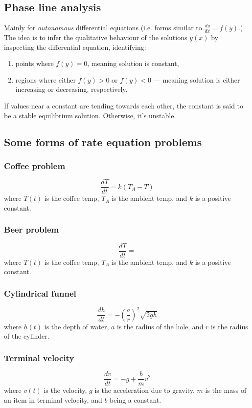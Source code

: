 \documentclass[main.tex]{subfiles}
\begin{document}
	\subsection*{Phase line analysis}
	Mainly for \emph{autonomous} differential equations (i.e. forms similar to \(\frac{dy}{dx} = f(y)\).)
	The idea is to infer the qualitative behaviour of the solutions \(y(x)\) by inspecting the differential equation, identifying:
	\begin{enumerate}
	\item points where \(f(y) = 0\), meaning solution is constant,
	\item regions where either \(f(y) > 0\) or \(f(y) < 0\) --- meaning solution is either increasing or decreasing, respectively.
	\end{enumerate}

	If values near a constant are tending towards each other, the constant is said to be a stable equilibrium solution. Otherwise, it's unstable.

	\subsection*{Some forms of rate equation problems}
	\subsubsection*{Coffee problem}
	\[\frac{dT}{dt} = k(T_A - T)\]
	where \(T(t)\) is the coffee temp, \(T_A\) is the ambient temp, and \(k\) is a positive constant.

	\subsubsection*{Beer problem}
	\[\frac{dT}{dt} =\]
	where \(T(t)\) is the coffee temp, \(T_A\) is the ambient temp, and \(k\) is a positive constant.

	\subsubsection*{Cylindrical funnel}
	\[\frac{dh}{dt} = - \left(\frac{a}{r}\right)^2 \sqrt{2gh}\]
	where \(h(t)\) is the depth of water, \(a\) is the radius of the hole, and \(r\) is the radius of the cylinder.

	\subsubsection*{Terminal velocity}
	\[\frac{dv}{dt} = -g + \frac{b}{m} v^2\]
	where \(v(t)\) is the velocity, \(g\) is the acceleration due to gravity, \(m\) is the mass of an item in terminal velocity, and \(b\) being a constant.
\end{document}

